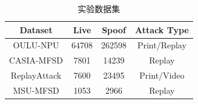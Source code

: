 \begin{table}[H]
\centering
\caption{实验数据集}
\begin{tabular}{cccc}
\toprule
Dataset & Live & Spoof & Attack Type \\
\midrule
OULU-NPU & 64708 & 262598 & Print/Replay \\
CASIA-MFSD & 7801 & 14239 & Replay \\
ReplayAttack & 7600 & 23495 & Print/Video \\
MSU-MFSD & 1053 & 2966 & Replay \\
\bottomrule
\end{tabular}
\label{tab:dataset}
\end{table}
